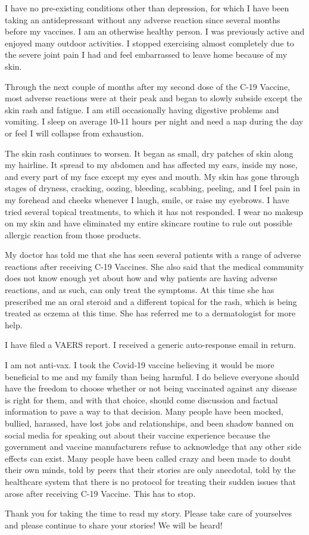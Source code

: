{I have no pre-existing conditions other than depression, for which I have been
taking an antidepressant without any adverse reaction since several months
before my vaccines. I am an otherwise healthy person. I was previously active
and enjoyed many outdoor activities. I stopped exercising almost completely due
to the severe joint pain I had and feel embarrassed to leave home because of my
skin.

Through the next couple of months after my second dose of the C-19 Vaccine, most
adverse reactions were at their peak and began to slowly subside except the skin
rash and fatigue. I am still occasionally having digestive problems and
vomiting. I sleep on average 10-11 hours per night and need a nap during the day
or feel I will collapse from exhaustion.

The skin rash continues to worsen. It began as small, dry patches of skin along
my hairline. It spread to my abdomen and has affected my ears, inside my nose,
and every part of my face except my eyes and mouth. My skin has gone through
stages of dryness, cracking, oozing, bleeding, scabbing, peeling, and I feel
pain in my forehead and cheeks whenever I laugh, smile, or raise my eyebrows. I
have tried several topical treatments, to which it has not responded. I wear no
makeup on my skin and have eliminated my entire skincare routine to rule out
possible allergic reaction from those products.

My doctor has told me that she has seen several patients with a range of adverse
reactions after receiving C-19 Vaccines. She also said that the medical
community does not know enough yet about how and why patients are having adverse
reactions, and as such, can only treat the symptoms. At this time she has
prescribed me an oral steroid and a different topical for the rash, which is
being treated as eczema at this time. She has referred me to a dermatologist for
more help.

I have filed a VAERS report. I received a generic auto-response email in return.

I am not anti-vax. I took the Covid-19 vaccine believing it would be more
beneficial to me and my family than being harmful. I do believe everyone should
have the freedom to choose whether or not being vaccinated against any disease
is right for them, and with that choice, should come discussion and factual
information to pave a way to that decision. Many people have been mocked,
bullied, harassed, have lost jobs and relationships, and been shadow banned on
social media for speaking out about their vaccine experience because the
government and vaccine manufacturers refuse to acknowledge that any other side
effects can exist. Many people have been called crazy and been made to doubt
their own minds, told by peers that their stories are only anecdotal, told by
the healthcare system that there is no protocol for treating their sudden issues
that arose after receiving C-19 Vaccine. This has to stop.

Thank you for taking the time to read my story. Please take care of yourselves
and please continue to share your stories! We will be heard!

}
